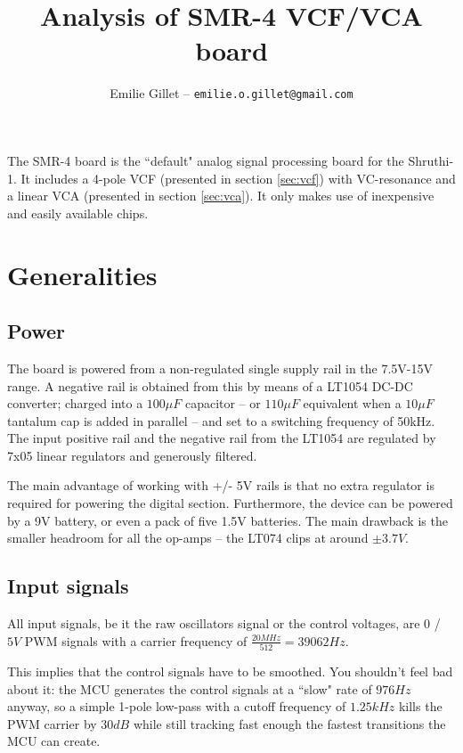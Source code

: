 \documentclass[a4paper,11pt]{article}
\title{Analysis of SMR-4 VCF/VCA board}
\author{Emilie Gillet -- \tt emilie.o.gillet@gmail.com}
\date{}
\begin{document}
\maketitle

The SMR-4 board is the ``default" analog signal processing board for the  Shruthi-1. It includes a 4-pole VCF (presented in section \ref{sec:vcf}) with VC-resonance and a linear VCA (presented in section \ref{sec:vca}). It only makes use of inexpensive and easily available chips.

\section{Generalities}

\subsection{Power}

The board is powered from a non-regulated single supply rail in the 7.5V-15V range. A negative rail is obtained from this by means of a LT1054 DC-DC converter; charged into a $100\mu F$ capacitor -- or $110\mu F$ equivalent when a $10\mu F$ tantalum cap is added in parallel -- and set to a switching frequency of 50kHz. The input positive rail and the negative rail from the LT1054 are regulated by 7x05 linear regulators and generously filtered.

The main advantage of working with +/- 5V rails is that no extra regulator is required for powering the digital section. Furthermore, the device can be powered by a 9V battery, or even a pack of five 1.5V batteries. The main drawback is the smaller headroom for all the op-amps -- the LT074 clips at around $\pm 3.7V$.

\subsection{Input signals}

All input signals, be it the raw oscillators signal or the control voltages, are $0$ / $5V$ PWM signals with a carrier frequency of $\frac{20MHz}{512} = 39062 Hz$.

This implies that the control signals have to be smoothed. You shouldn't feel bad about it: the MCU generates the control signals at a ``slow" rate of $976 Hz$ anyway, so a simple 1-pole low-pass with a cutoff frequency of $1.25 kHz$ kills the PWM carrier by $30dB$ while still tracking fast enough the fastest transitions the MCU can create.
\end{document}
